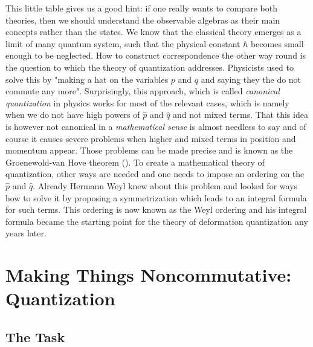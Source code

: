 This little table gives us a good hint: if one really wants to compare both theories, then we should understand the observable algebras as their main concepts rather than the states. We know that the classical theory emerges as a limit of many quantum system, such that the physical constant $\hbar$ becomes small enough to be neglected. How to construct correspondence the other way round is the question to which the theory of quantization addresses. Physicists used to solve this by "making a hat on the variables $p$ and $q$ and saying they the do not commute any more". Surprisingly, this approach, which is called \emph{canonical quantization} in physics works for most of the relevant cases, which is namely when we do not have high powers of $\hat p$ and $\hat q$ and not mixed terms. That this idea is however not canonical in a \emph{mathematical sense} is almost needless to say and of course it causes severe problems when higher and mixed terms in position and momentum appear. Those problems can be made precise and is known as the Groenewold-van Hove theorem (\cite{vanhove:1951a, groenewold:1946a}). To create a mathematical theory of quantization, other ways are needed and one needs to impose an ordering on the $\hat p$ and $\hat q$. Already Hermann Weyl knew about this problem and looked for ways how to solve it by proposing a symmetrization \cite{weyl:1931a} which leads to an integral formula for such terms. This ordering is now known as the Weyl ordering and his integral formula became the starting point for the theory of deformation quantization any years later.



\section{Making Things Noncommutative: Quantization}
\label{sec:chap2_Quantization}

\subsection{The Task}
\label{subsec:chap2_Task}

